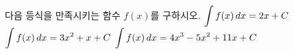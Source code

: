 다음 등식을 만족시키는 함수 $f(x)$를 구하시오. 
 $\displaystyle\int f(x)\mkern3mu dx=2x+C$
 $\displaystyle\int f(x)\mkern3mu dx=3x^2+x+C$
 $\displaystyle\int f(x)\mkern3mu dx=4x^3-5x^2+11x+C$
